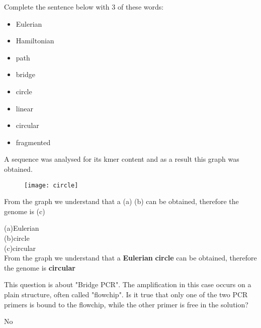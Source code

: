 \begin{Exercise} [
  label={ex26},
  origin={G. Valle}
 ]

Complete the sentence below with 3 of these words:
\begin{itemize}
\item Eulerian
\item Hamiltonian
\item path
\item bridge
\item circle
\item linear
\item circular
\item fragmented
\end{itemize}

A sequence was analysed for its kmer content and as a result this graph was
obtained.

\begin{figure}[H]
  \centering
  \texttt{[image: circle]}
\end{figure}

\Question From the graph we understand that a (a) (b) can be obtained,
therefore the genome is (c)

\end{Exercise}

\begin{Answer} [
  ref={ex26},
  number={1}
 ]

\Question (a)Eulerian \\(b)circle \\(c)circular\\
From the graph we understand that a \textbf{Eulerian} \textbf{circle} can be
obtained, therefore the genome is \textbf{circular}

\end{Answer}

\begin{Exercise} [
  label={ex27},
  origin={G. Valle}
 ]

\Question This question is about "Bridge PCR". The amplification in this case
occurs on a plain structure, often called "flowchip". Is it true that only one
of the two PCR primers is bound to the flowchip, while the other primer is free
in the solution?

\end{Exercise}

\begin{Answer} [
  ref={ex27},
  number={1}
 ]

\Question No

\end{Answer}

